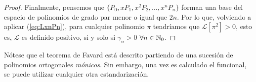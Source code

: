 \begin{proof}
    Finalmente, pensemos que $\{P_0, xP_1, x^2P_2,\dots,x^nP_n\}$ forman una base del espacio de polinomios de grado par menor o igual que $2n$. Por lo que, volviendo a aplicar (\ref{eq:LxnPn}), para cualquier polinomio $\pi$ tendríamos que $\mathcal L[\pi^2] > 0$, esto es, $\mathcal{L}$ es definido positivo, si y solo si $\gamma_n > 0$ $\forall n\in\mathbb{N}_0$.


\end{proof}

\begin{observacion}
    Nótese que el teorema de Favard está descrito partiendo de una sucesión de polinomios ortogonales \textit{mónicos}. Sin embargo, una vez es calculado el funcional, se puede utilizar cualquier otra estandarización. 

\end{observacion}